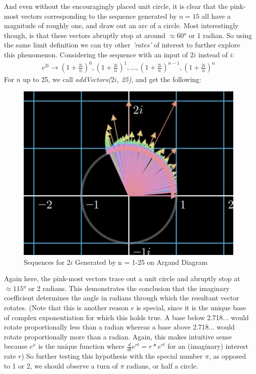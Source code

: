 \documentclass[11pt,a4paper]{article}
\begin{document}
And even without the encouragingly placed unit circle, it is clear that the pink-most vectors corresponding to the sequence generated by $n=15$ all have a magnitude of roughly one, and draw out an arc of a circle. Most interestingly though, is that these vectors abruptly stop at around $\approx 60$° or 1 radian. So using the same limit definition we can try other \textit{'rates'} of interest to further explore this phenomenon. Considering the sequence with an input of $2i$ instead of $i$:
\begin{align*}
e^{2i} \rightarrow  \left( 1+ \frac{2i}{n} \right) ^0, \left( 1+ \frac{2i}{n} \right) ^1,  ... ,\left( 1+ \frac{2i}{n} \right) ^{n-1},  \left( 1+ \frac{2i}{n} \right) ^{n}
\end{align*}
For $n$ up to 25, we call \textit{addVectors($2i$, 25)}, and get the following:

\begin{figure}[h]
\begin{center}
\includegraphics[scale=.5]{twotwentyfive} 
\caption{Sequences for $2i$ Generated by n = 1-25 on Argand Diagram}
\end{center}
\end{figure}

Again here, the pink-most vectors trace out a unit circle and abruptly stop at $\approx 115$° or 2 radians.  This demonstrates the conclusion that the imaginary coefficient determines the angle in radians through which the resultant vector rotates.  (Note that this is another reason $e$ is special, since it is the unique base of complex exponentiation for which this holds true. A base below 2.718... would rotate proportionally less than a radian whereas a base above 2.718... would rotate proportionally more than a radian. Again, this makes intuitive sense because $e^x$ is the unique function where $\frac{d}{dt} e^{rt} = r*e^{rt}$ for an (imaginary) interest rate $r$)
So further testing this hypothesis with the special number $\pi$, as opposed to 1 or 2, we should observe a turn of $\pi$ radians, or half a circle.
\end{document}
